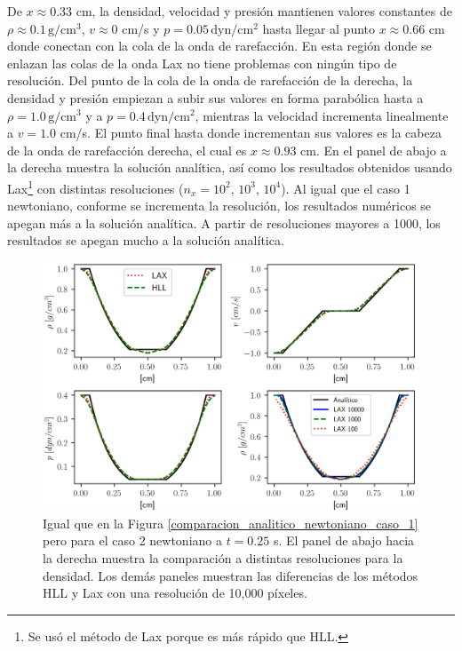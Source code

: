 \documentclass[12pt,a4paper]{book}
\begin{document}
De $x \approx 0.33$ cm, la densidad, velocidad y presión 
mantienen valores constantes de $\rho \approx 0.1 \,  \text{g}/ \text{cm}^3$, $v \approx 0$ cm/s y 
$p = 0.05 \,  \text{dyn}/ \text{cm}^2 $ 
hasta llegar al punto $x \approx 0.66$ cm donde conectan con la cola de la onda de rarefacción. En
esta región donde se enlazan las colas de la onda Lax no tiene problemas con ningún tipo de resolución.
Del punto de la cola de la onda de rarefacción de la derecha, la densidad y presión empiezan a subir 
sus valores en forma parabólica hasta a $\rho  =  1.0 \,  \text{g}/ \text{cm}^3 $ y 
a $p = 0.4 \,  \text{dyn}/ \text{cm}^2 $, 
mientras la velocidad incrementa
linealmente a $v = 1.0$ cm/s. El punto final hasta donde incrementan sus valores es la cabeza de la onda 
de rarefacción derecha, el cual es $ x \approx 0.93 $ cm.
En el panel de abajo a la derecha muestra la solución analítica, así como los resultados obtenidos 
usando Lax\footnote{
  Se usó el método de Lax porque es más rápido que HLL. 
}
con distintas resoluciones ($n_x = 10^2, \, 10^3, \,10^4$). Al igual que el caso 1 newtoniano,
conforme se incrementa la resolución, los resultados numéricos se apegan más a la solución analítica.
A partir de resoluciones mayores a 1000, los resultados se apegan mucho a la solución analítica.




\begin{figure}
  \centering
    \includegraphics[width=1.0\textwidth]{./Figuras/verificacion_del_codigo/rarefaction-rarefaction.png}
  \caption{ Igual que en la Figura \ref{comparacion_analitico_newtoniano_caso_1} pero para el 
  caso 2 newtoniano a $t = 0.25$ s.
  El panel de abajo hacia la derecha muestra la comparación a distintas resoluciones para la densidad. 
  Los demás paneles muestran las diferencias de los métodos HLL y Lax con una resolución 
  de 10,000 píxeles.
  \label{comparacion_analitico_newtoniano_caso_2}} 
\end{figure}
\end{document}
